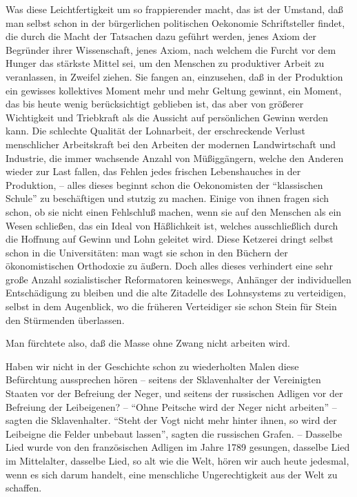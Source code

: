 \documentclass{scrbook}
\begin{document}
Was diese Leichtfertigkeit um so frappierender macht, das ist der Umstand, daß man selbst schon in der bürgerlichen politischen Oekonomie Schriftsteller findet, die durch die Macht der Tatsachen dazu geführt werden, jenes Axiom der Begründer ihrer Wissenschaft, jenes Axiom, nach welchem die Furcht vor dem Hunger das stärkste Mittel sei, um den Menschen zu produktiver Arbeit zu veranlassen, in Zweifel ziehen. Sie fangen an, einzusehen, daß in der Produktion ein gewisses kollektives Moment mehr und mehr Geltung gewinnt, ein Moment, das bis heute wenig berücksichtigt geblieben ist, das aber von größerer Wichtigkeit und Triebkraft als die Aussicht auf persönlichen Gewinn werden kann. Die schlechte Qualität der Lohnarbeit, der erschreckende Verlust menschlicher Arbeitskraft bei den Arbeiten der modernen Landwirtschaft und Industrie, die immer wachsende Anzahl von Müßiggängern, welche den Anderen wieder zur Last fallen, das Fehlen jedes frischen Lebenshauches in der Produktion, – alles dieses beginnt schon die Oekonomisten der ``klassischen Schule'' zu beschäftigen und stutzig zu machen. Einige von ihnen fragen sich schon, ob sie nicht einen Fehlschluß machen, wenn sie auf den Menschen als ein Wesen schließen, das ein Ideal von Häßlichkeit ist, welches ausschließlich durch die Hoffnung auf Gewinn und Lohn geleitet wird. Diese Ketzerei dringt selbst schon in die Universitäten: man wagt sie schon in den Büchern der ökonomistischen Orthodoxie zu äußern. Doch alles dieses verhindert eine sehr große Anzahl sozialistischer Reformatoren keineswegs, Anhänger der individuellen Entschädigung zu bleiben und die alte Zitadelle des Lohnsystems zu verteidigen, selbst in dem Augenblick, wo die früheren Verteidiger sie schon Stein für Stein den Stürmenden überlassen.

Man fürchtete also, daß die Masse ohne Zwang nicht arbeiten wird.

Haben wir nicht in der Geschichte schon zu wiederholten Malen diese Befürchtung aussprechen hören – seitens der Sklavenhalter der Vereinigten Staaten vor der Befreiung der Neger, und seitens der russischen Adligen vor der Befreiung der Leibeigenen? – ``Ohne Peitsche wird der Neger nicht arbeiten'' – sagten die Sklavenhalter. ``Steht der Vogt nicht mehr hinter ihnen, so wird der Leibeigne die Felder unbebaut lassen'', sagten die russischen Grafen. – Dasselbe Lied wurde von den französischen Adligen im Jahre 1789 gesungen, dasselbe Lied im Mittelalter, dasselbe Lied, so alt wie die Welt, hören wir auch heute jedesmal, wenn es sich darum handelt, eine menschliche Ungerechtigkeit aus der Welt zu schaffen.
\end{document}
